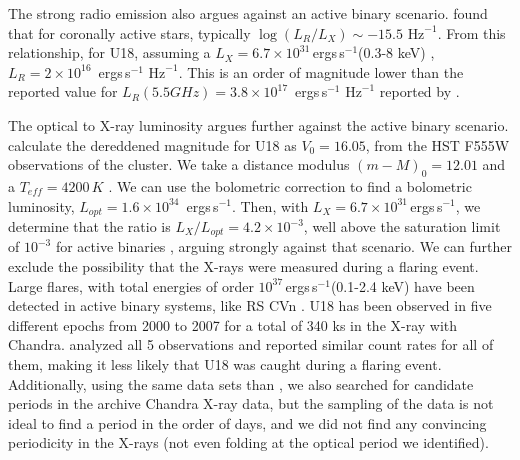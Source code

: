 \documentclass[fleqn,usenatbib,useAMS,letters]{mnras}
\newcommand{\ergs}{\,ergs\,s$^{-1}$} %
\begin{document}
 
 
 The strong radio emission also argues against an active binary scenario. \citet{Guedel1993} found that for coronally active stars, typically $\log(L_R/L_X) \sim -15.5 \text{ Hz}^{-1}$. From this relationship, for U18, assuming a $L_X= 6.7 \times 10 ^{31}$\ergs (0.3-8 keV) \citep{bogdanov_chandra_2010}, $L_R = 2 \times 10^{16}$ \ergs $\text{ Hz}^{-1}$. This is an order of magnitude lower than the reported value for $L_R (5.5 GHz) = 3.8\times 10^{17}$ \ergs $\text{ Hz}^{-1}$ reported by \citet{CoryPaper}. 
 
 The optical to X-ray luminosity argues further against the active binary scenario. \cite{Pallanca2017Halpha} calculate the dereddened  magnitude for U18 as $V_0 = 16.05$, from the HST F555W observations of the cluster. We take a distance modulus $(m-M)_0 = 12.01$ \citep{Gratton2003} and a $T_{eff} = 4200 \, K$ \citep{Husser2016MUSE}. We can use the \cite{Flower1996BC} bolometric correction to find a bolometric luminosity, $L_{opt} = 1.6 \times 10^{34}$ \ergs.  Then, with $L_X= 6.7 \times 10 ^{31}$\ergs \citep[0.3-8 keV;][]{bogdanov_chandra_2010}, we determine that the ratio is $L_X/L_{opt} = 4.2 \times 10^{-3}$, well above the saturation limit of $10^{-3}$ for active binaries \citep{VilhuSaturation2,VilhuSaturationLimit}, arguing strongly against that scenario. We can further exclude the possibility that the X-rays were measured during a flaring event. Large flares, with total energies of order $10^{37}$\ergs  (0.1-2.4 keV) have been detected in active binary systems, like RS CVn \citep[e.g.,][]{Kuerster1996}. U18 has been observed in five different epochs from 2000 to 2007 for a total of 340 ks in the X-ray with Chandra. \citet{bogdanov_chandra_2010} analyzed all 5 observations and reported similar count rates for all of them, making it less likely that U18 was caught during a flaring event. 
Additionally, using the same data sets than \citet{bogdanov_chandra_2010}, we also searched for candidate periods in the archive Chandra X-ray data, but the sampling of the data is not ideal to find a period in the order of days, and we did not find any convincing periodicity in the X-rays (not even folding at the optical period we identified). 

 
 
\end{document}
